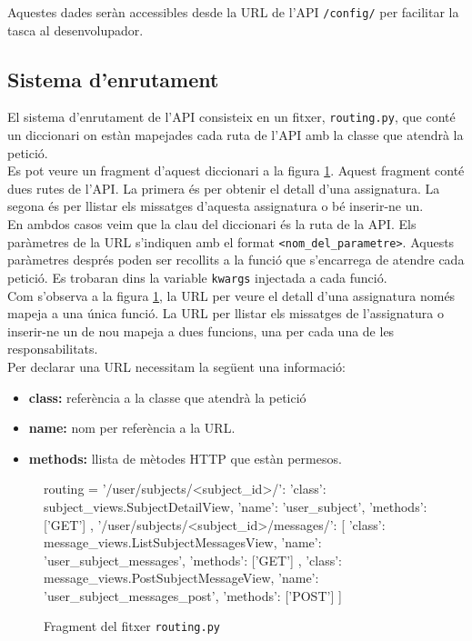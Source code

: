 Aquestes dades seràn accessibles desde la \ac{URL} de l'\ac{API} \texttt{/config/} per facilitar la tasca al desenvolupador.

\subsection{Sistema d'enrutament}

El sistema d'enrutament de l'\ac{API} consisteix en un fitxer, \texttt{routing.py}, que conté un diccionari on estàn mapejades cada ruta de l'\ac{API} amb la classe que atendrà la petició.\\

 Es pot veure un fragment d'aquest diccionari a la figura \ref{fig:routing}. Aquest fragment conté dues rutes de l'\ac{API}. La primera és per obtenir el detall d'una assignatura. La segona és per llistar els missatges d'aquesta assignatura o bé inserir-ne un.\\

En ambdos casos veim que la clau del diccionari és la ruta de la \ac{API}. Els paràmetres de la \ac{URL} s'indiquen amb el format \texttt{<nom\_del\_parametre>}. Aquests paràmetres després poden ser recollits a la funció que s'encarrega de atendre cada petició. Es trobaran dins la variable \texttt{kwargs} injectada a cada funció. \\

Com s'observa a la figura \ref{fig:routing}, la \ac{URL} per veure el detall d'una assignatura només mapeja a una única funció. La \ac{URL} per llistar els missatges de l'assignatura o inserir-ne un de nou mapeja a dues funcions, una per cada una de les responsabilitats.\\

Per declarar una \ac{URL} necessitam la següent una informació:

\begin{itemize}
	\item \textbf{class:} referència a la classe que atendrà la petició
	\item \textbf{name:} nom per referència a la \ac{URL}.
	\item \textbf{methods:} llista de mètodes \ac{HTTP} que estàn permesos.
\end{itemize}

\begin{figure}[h!]
	\begin{python}
routing = {
	'/user/subjects/<subject_id>/': {
		'class': subject_views.SubjectDetailView,
		'name': 'user_subject',
		'methods': ['GET']
	},
	'/user/subjects/<subject_id>/messages/': [
		{
			'class': message_views.ListSubjectMessagesView,
			'name': 'user_subject_messages',
			'methods': ['GET']
		},
		{
			'class': message_views.PostSubjectMessageView,
			'name': 'user_subject_messages_post',
			'methods': ['POST']
		}
	]
}
	\end{python}
	\caption{Fragment del fitxer \texttt{routing.py}}
	\label{fig:routing}
\end{figure}


